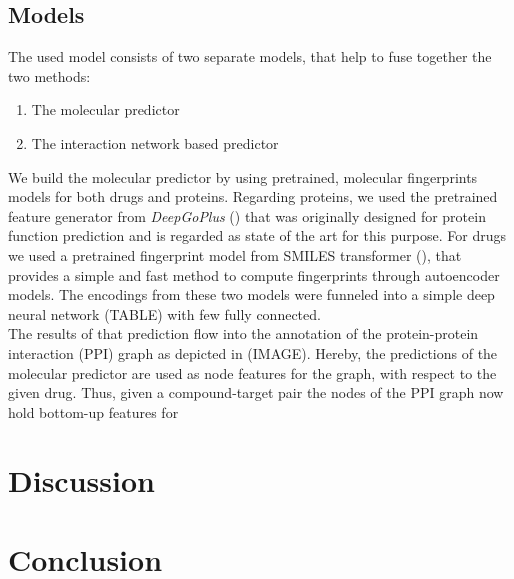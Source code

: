 \documentclass{bioinfo}
\begin{document}
\subsection{Models}
The used model consists of two separate models, that help to fuse together the two methods:
\begin{enumerate}
	\item The molecular predictor
	\item The interaction network based predictor
\end{enumerate}
We build the molecular predictor by using pretrained, molecular fingerprints models for both drugs and proteins. Regarding proteins, we used the pretrained feature generator from \textit{DeepGoPlus} (\citep{DeepGoPlus}) that was originally designed for protein function prediction and is regarded as state of the art for this purpose. For drugs we used a pretrained fingerprint model from SMILES transformer (\cite{SmilesTransformer}), that provides a simple and fast method to compute fingerprints through autoencoder models. The encodings from these two models were funneled into a simple deep neural network (TABLE) with few fully connected. \\
The results of that prediction flow into the annotation of the protein-protein interaction (PPI) graph as depicted in (IMAGE). Hereby, the predictions of the molecular predictor are used as node features for the graph, with respect to the given drug. Thus, given a compound-target pair the nodes of the PPI graph now hold bottom-up features for 



\section{Discussion}







%
%






\section{Conclusion}
\end{document}

